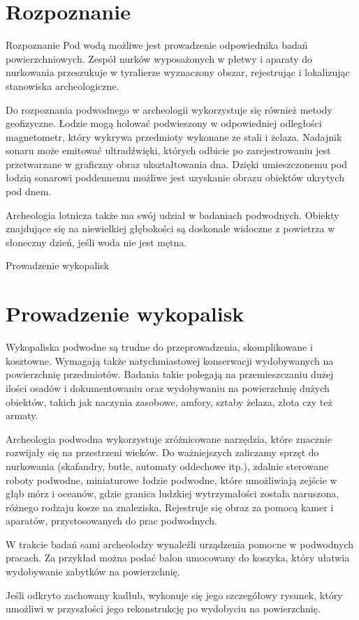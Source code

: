 \documentclass{beamer}
\begin{document}
\section{Rozpoznanie}
\begin{frame}{Rozpoznanie}
Pod wodą możliwe jest prowadzenie odpowiednika badań powierzchniowych. Zespół nurków wyposażonych w płetwy i aparaty do nurkowania przeszukuje w tyralierze wyznaczony obszar, rejestrując i lokalizując stanowiska archeologiczne.

Do rozpoznania podwodnego w archeologii wykorzystuje się również metody geofizyczne. Łodzie mogą holować podwieszony w odpowiedniej odległości magnetometr, który wykrywa przedmioty wykonane ze stali i żelaza. Nadajnik sonaru może emitować ultradźwięki, których odbicie po zarejestrowaniu jest przetwarzane w graficzny obraz ukształtowania dna. Dzięki umieszczonemu pod łodzią sonarowi poddennemu możliwe jest uzyskanie obrazu obiektów ukrytych pod dnem.

Archeologia lotnicza także ma swój udział w badaniach podwodnych. Obiekty znajdujące się na niewielkiej głębokości są doskonale widoczne z powietrza w słoneczny dzień, jeśli woda nie jest mętna.
\end{frame}


\begin{frame}{Prowadzenie wykopalisk}
\section{Prowadzenie wykopalisk}
Wykopaliska podwodne są trudne do przeprowadzenia, skomplikowane i kosztowne. Wymagają także natychmiastowej konserwacji wydobywanych na powierzchnię przedmiotów. Badania takie polegają na przemieszczaniu dużej ilości osadów i dokumentowaniu oraz wydobywaniu na powierzchnię dużych obiektów, takich jak naczynia zasobowe, amfory, sztaby żelaza, złota czy też armaty.

Archeologia podwodna wykorzystuje zróżnicowane narzędzia, które znacznie rozwijały się na przestrzeni wieków. Do ważniejszych zaliczamy sprzęt do nurkowania (skafandry, butle, automaty oddechowe itp.), zdalnie sterowane roboty podwodne, miniaturowe łodzie podwodne, które umożliwiają zejście w głąb mórz i oceanów, gdzie granica ludzkiej wytrzymałości została naruszona, różnego rodzaju kosze na znaleziska. Rejestruje się obraz za pomocą kamer i aparatów, przystosowanych do prac podwodnych.

W trakcie badań sami archeolodzy wynaleźli urządzenia pomocne w podwodnych pracach. Za przykład można podać balon umocowany do koszyka, który ułatwia wydobywanie zabytków na powierzchnię.

Jeśli odkryto zachowany kadłub, wykonuje się jego szczegółowy rysunek, który umożliwi w przyszłości jego rekonstrukcję po wydobyciu na powierzchnię.
\end{frame}
\end{document}
